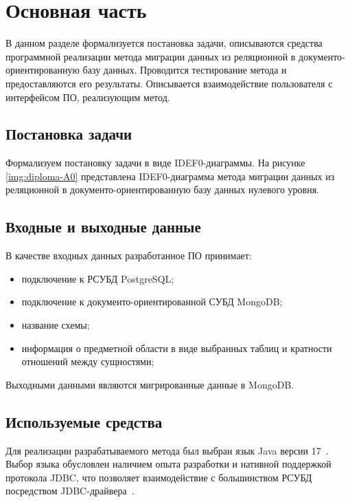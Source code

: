 \chapter{Основная часть}

В данном разделе формализуется постановка задачи, 
описываются средства программной реализации метода 
миграции данных из реляционной в документо-ориентированную базу данных.
Проводится тестирование метода и предоставляются его результаты.
Описывается взаимодействие пользователя с интерфейсом ПО, реализующим метод.



\section{Постановка задачи}
Формализуем постановку задачи в виде IDEF0-диаграммы.
На рисунке \ref{img:diploma-A0} представлена IDEF0-диаграмма метода
миграции данных из реляционной в документо-ориентированную базу данных нулевого уровня.


\clearpage

\section{Входные и выходные данные}
В качестве входных данных разработанное ПО принимает:
\begin{itemize}[label=---]
    \item подключение к РСУБД PostgreSQL;
    \item подключение к документо-ориентированной СУБД MongoDB;
    \item название схемы;
    \item информация о предметной области в виде выбранных таблиц и кратности отношений между сущностями;
\end{itemize}

Выходными данными являются мигрированные данные в MongoDB.


\section{Используемые средства}
Для реализации разрабатываемого метода был выбран язык Java версии 17~\cite{openjdk-17}.
Выбор языка обусловлен наличием опыта разработки и нативной поддержкой протокола JDBC,
что позволяет взаимодействие с большинством РСУБД посредством JDBC-драйвера~\cite{jdbc-api}.


